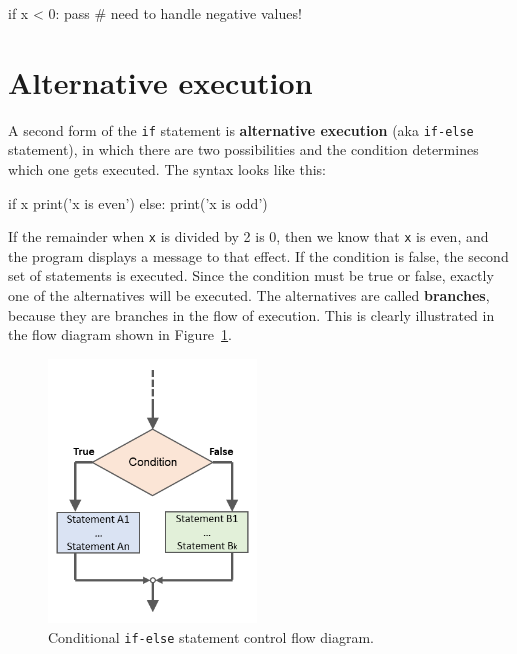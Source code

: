 
\beforeverb
\begin{pycode}
if x < 0:
    pass          # need to handle negative values!
\end{pycode}
\afterverb
%

\section{Alternative execution}
\label{alternative execution}


A second form of the {\tt if} statement is {\bf alternative execution} (aka {\tt if-else} statement),
in which there are two possibilities and the condition determines
which one gets executed.  The syntax looks like this:

\beforeverb
\begin{pycode}
if x%
    print('x is even')
else:
    print('x is odd')
\end{pycode}
\afterverb
%
If the remainder when {\tt x} is divided by 2 is 0, then we
know that {\tt x} is even, and the program displays a message to that
effect.  If the condition is false, the second set of statements is
executed.  Since the condition must be true or false, exactly one of
the alternatives will be executed.  The alternatives are called
{\bf branches}, because they are branches in the flow of execution.
This is clearly illustrated in the flow diagram shown in Figure~\ref{fig:if-else-statement}.


\begin{figure}[htb]%
\begin{center}
\includegraphics[height=7cm]{figs/ifelsestatementdiagram.png}%
\caption{Conditional {\tt if-else} statement control flow diagram.}%
\label{fig:if-else-statement}%
\end{center}
\end{figure}



